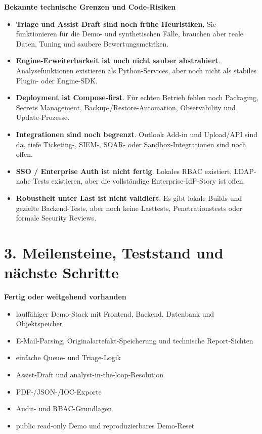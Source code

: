 \documentclass[10pt,a4paper]{article}
\begin{document}
\noindent\textbf{Bekannte technische Grenzen und Code-Risiken}
\begin{itemize}
  \item \textbf{Triage und Assist Draft sind noch frühe Heuristiken}. Sie funktionieren für die Demo- und synthetischen Fälle, brauchen aber reale Daten, Tuning und saubere Bewertungsmetriken.
  \item \textbf{Engine-Erweiterbarkeit ist noch nicht sauber abstrahiert}. Analysefunktionen existieren als Python-Services, aber noch nicht als stabiles Plugin- oder Engine-SDK.
  \item \textbf{Deployment ist Compose-first}. Für echten Betrieb fehlen noch Packaging, Secrets Management, Backup-/Restore-Automation, Observability und Update-Prozesse.
  \item \textbf{Integrationen sind noch begrenzt}. Outlook Add-in und Upload/API sind da, tiefe Ticketing-, SIEM-, SOAR- oder Sandbox-Integrationen sind noch offen.
  \item \textbf{SSO / Enterprise Auth ist nicht fertig}. Lokales RBAC existiert, LDAP-nahe Tests existieren, aber die vollständige Enterprise-IdP-Story ist offen.
  \item \textbf{Robustheit unter Last ist nicht validiert}. Es gibt lokale Builds und gezielte Backend-Tests, aber noch keine Lasttests, Penetrationstests oder formale Security Reviews.
\end{itemize}

\newpage

\section*{3. Meilensteine, Teststand und nächste Schritte}

\noindent\textbf{Fertig oder weitgehend vorhanden}
\begin{itemize}
  \item lauffähiger Demo-Stack mit Frontend, Backend, Datenbank und Objektspeicher
  \item E-Mail-Parsing, Originalartefakt-Speicherung und technische Report-Sichten
  \item einfache Queue- und Triage-Logik
  \item Assist-Draft und analyst-in-the-loop-Resolution
  \item PDF-/JSON-/IOC-Exporte
  \item Audit- und RBAC-Grundlagen
  \item public read-only Demo und reproduzierbares Demo-Reset
\end{itemize}
\end{document}
